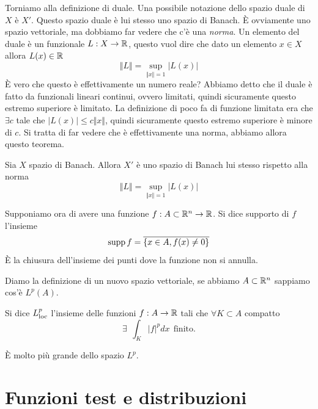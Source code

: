 Torniamo alla definizione di duale. Una possibile notazione dello spazio duale di $X$ è $X'$. Questo spazio duale è lui stesso uno spazio di Banach. È ovviamente uno spazio vettoriale, ma dobbiamo far vedere che c'è una \textit{norma}. Un elemento del duale è un funzionale $L: X\rightarrow \mathbb{R}$, questo vuol dire che dato un elemento $x\in X$ allora $L(x) \in \mathbb{R}$
\begin{equation*}
\Vert L \Vert = \sup_{\Vert x \Vert = 1}| L(x)|
\end{equation*}
È vero che questo è effettivamente un numero reale? Abbiamo detto che il duale è fatto da funzionali lineari continui, ovvero limitati, quindi sicuramente questo estremo superiore è limitato. La definizione di poco fa di funzione limitata era che $\exists c$ tale che $| L(x)| \leq c \Vert x \Vert $, quindi sicuramente questo estremo superiore è minore di $c$. Si tratta di far vedere che è effettivamente una norma, abbiamo allora questo teorema.
\begin{thm}
Sia $X$ spazio di Banach. Allora $X'$ è uno spazio di Banach lui stesso rispetto alla norma
\begin{equation*}
\Vert L \Vert = \sup_{\Vert x \Vert = 1}| L(x)|
\end{equation*}
\end{thm}
\begin{defn}
Supponiamo ora di avere una funzione $f: A\subset \mathbb{R}^{n}\rightarrow \mathbb{R}$. Si dice supporto di $f$ l'insieme
\begin{equation*}
\operatorname*{supp} f = \overline{\{x\in A, f(x) \neq 0\}}
\end{equation*}
È la chiusura dell'insieme dei punti dove la funzione non si annulla.
\end{defn}
Diamo la definizione di un nuovo spazio vettoriale, se abbiamo $A\subset \mathbb{R}^{n}$ sappiamo cos'è $L^{p}(A)$.
\begin{defn}
Si dice $L^{p}_{\operatorname{loc}}$ l'insieme delle funzioni $f: A\rightarrow \mathbb{R}$ tali che $\forall K\subset A$ compatto
\begin{equation*}
\exists \ \ \int_{K}| f|^{p} dx\ \ \text{finito} .
\end{equation*}
\end{defn}
È molto più grande dello spazio $L^{p}$.

\section{Funzioni test e distribuzioni}

